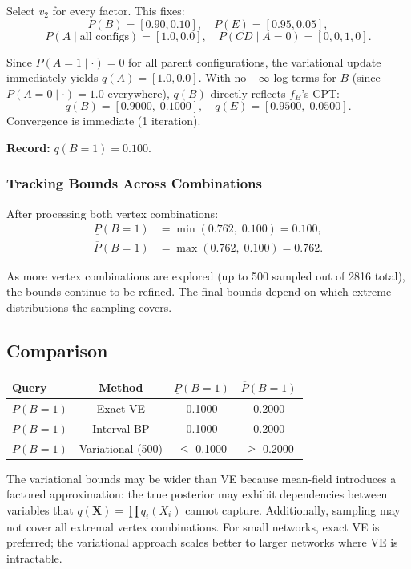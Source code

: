 \documentclass[11pt]{article}
\begin{document}
Select $v_2$ for every factor. This fixes:
\[
  P(B) = [0.90, 0.10], \quad P(E) = [0.95, 0.05],
\]
\[
  P(A \mid \text{all configs}) = [1.0, 0.0], \quad
  P(CD \mid A{=}0) = [0, 0, 1, 0].
\]

Since $P(A{=}1 \mid \cdot) = 0$ for all parent configurations, the variational
update immediately yields $q(A) = [1.0, 0.0]$.
With no $-\infty$ log-terms for $B$ (since $P(A{=}0 \mid \cdot) = 1.0$
everywhere), $q(B)$ directly reflects $f_B$'s CPT:
\[
  q(B) = [0.9000,\; 0.1000], \quad q(E) = [0.9500,\; 0.0500].
\]
Convergence is immediate (1 iteration).

\textbf{Record:} $q(B{=}1) = 0.100$.

\subsubsection{Tracking Bounds Across Combinations}

After processing both vertex combinations:
\begin{align*}
  \underline{P}(B{=}1) &= \min(0.762,\; 0.100) = 0.100, \\
  \overline{P}(B{=}1) &= \max(0.762,\; 0.100) = 0.762.
\end{align*}

As more vertex combinations are explored (up to 500 sampled out of 2816 total),
the bounds continue to be refined. The final bounds depend on which extreme
distributions the sampling covers.

\subsection{Comparison}

\begin{center}
\begin{tabular}{lccc}
\toprule
\textbf{Query} & \textbf{Method} & $\underline{P}(B{=}1)$ & $\overline{P}(B{=}1)$ \\
\midrule
$P(B{=}1)$ & Exact VE & 0.1000 & 0.2000 \\
$P(B{=}1)$ & Interval BP & 0.1000 & 0.2000 \\
$P(B{=}1)$ & Variational (500) & $\leq$ 0.1000 & $\geq$ 0.2000 \\
\bottomrule
\end{tabular}
\end{center}

The variational bounds may be wider than VE because mean-field introduces a
factored approximation: the true posterior may exhibit dependencies between
variables that $q(\mathbf{X}) = \prod q_i(X_i)$ cannot capture. Additionally,
sampling may not cover all extremal vertex combinations. For small networks,
exact VE is preferred; the variational approach scales better to larger networks
where VE is intractable.
\end{document}

